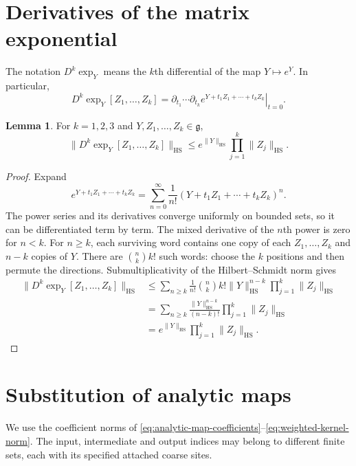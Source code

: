 \documentclass[10pt,reqno]{amsart}
\theoremstyle{definition}
\newtheorem{lemma}[definition]{Lemma}
\theoremstyle{remark}
\numberwithin{equation}{section}
\numberwithin{figure}{section}
\newcommand{\g}{\mathfrak g}
\begin{document}
\section{Derivatives of the matrix exponential}\label{sec:matrix-exponential-derivatives}
The notation $D^k\exp_Y$ means the $k$th differential of the map
$Y\mapsto e^Y$. In particular,
\begin{equation}\label{eq:matrix-exponential-mixed-differential}
D^k\exp_Y[Z_1,\ldots,Z_k]
=\left.\partial_{t_1}\cdots\partial_{t_k}
e^{Y+t_1Z_1+\cdots+t_kZ_k}\right|_{t=0}.
\end{equation}
\begin{lemma}\label{lem:matrix-exponential-derivatives}
For $k=1,2,3$ and $Y,Z_1,\ldots,Z_k\in\g$,
\begin{equation}\label{eq:matrix-exponential-derivative-bound}
\boxed{\|D^k\exp_Y[Z_1,\ldots,Z_k]\|_{\mathrm{HS}}
\le e^{\|Y\|_{\mathrm{HS}}}\prod_{j=1}^k\|Z_j\|_{\mathrm{HS}}.}
\end{equation}
\end{lemma}
\begin{proof}
Expand
\begin{equation}\label{eq:matrix-exponential-power-series}
e^{Y+t_1Z_1+\cdots+t_kZ_k}
=\sum_{n=0}^\infty\frac1{n!}(Y+t_1Z_1+\cdots+t_kZ_k)^n.
\end{equation}
The power series and its derivatives converge uniformly on bounded sets,
so it can be differentiated term by term. The mixed derivative of the
$n$th power is zero for $n<k$. For $n\ge k$, each surviving word contains
one copy of each $Z_1,\ldots,Z_k$ and $n-k$ copies of $Y$.
There are $\binom nk k!$ such words: choose the $k$ positions and
then permute the directions. Submultiplicativity of the Hilbert--Schmidt
norm gives
\begin{equation}\label{eq:matrix-exponential-word-count}
\begin{aligned}
\|D^k\exp_Y[Z_1,\ldots,Z_k]\|_{\mathrm{HS}}
&\le\sum_{n\ge k}\frac1{n!}\binom nk k!
\|Y\|_{\mathrm{HS}}^{n-k}\prod_{j=1}^k\|Z_j\|_{\mathrm{HS}}\\
&=\sum_{n\ge k}\frac{\|Y\|_{\mathrm{HS}}^{n-k}}{(n-k)!}
\prod_{j=1}^k\|Z_j\|_{\mathrm{HS}}\\
&=e^{\|Y\|_{\mathrm{HS}}}\prod_{j=1}^k\|Z_j\|_{\mathrm{HS}}.
\end{aligned}
\end{equation}
\end{proof}

\section{Substitution of analytic maps}\label{sec:weighted-substitution}
We use the coefficient norms of
\eqref{eq:analytic-map-coefficients}--\eqref{eq:weighted-kernel-norm}.
The input, intermediate and output indices may belong to different
finite sets, each with its specified attached coarse sites.
\end{document}
